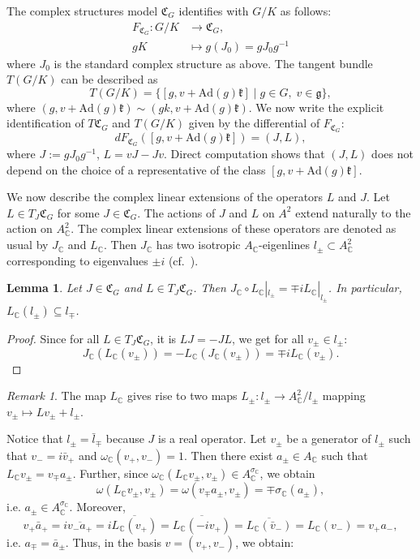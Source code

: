 \documentclass[oneside,11pt]{amsart}
\newtheorem{lem}[thm]{Lemma}
\theoremstyle{definition}
\theoremstyle{remark}
\newtheorem{rem}[thm]{Remark}
\numberwithin{thm}{section}
\numberwithin{equation}{section}
\begin{document}
The complex structures model $\mathfrak{C}_G$ identifies with $G/K$ as follows:
\begin{align*}
F_{\mathfrak{C}_G} \colon G/K&\to\mathfrak{C}_G,\\
gK& \mapsto g(J_0)=gJ_0g^{-1}
\end{align*}
where $J_0$ is the standard complex structure as above. The tangent bundle $T(G/K)$ can be described as 
$$T(G/K)=\{[g,v+\mathrm{Ad}(g)\mathfrak k]\mid g\in G,\;v\in\mathfrak g\},$$
where $(g,v+\mathrm{Ad}(g)\mathfrak k)\sim (gk,v+\mathrm{Ad}(g)\mathfrak k)$. We now write the explicit identification of $T\mathfrak{C}_G$ and $T(G/K)$ given by the differential of $F_{\mathfrak{C}_G}$: 
$$dF_{\mathfrak{C}_G}([g,v+\mathrm{Ad}(g)\mathfrak k])=(J,L),$$ 
where $J:=gJ_0g^{-1}$, $L=vJ-Jv$. Direct computation shows that $(J,L)$ does not depend on the choice of a representative of the class $[g,v+\mathrm{Ad}(g)\mathfrak k]$. 


We now describe the complex linear extensions of the operators $L$ and $J$. Let $L\in T_J\mathfrak{C}_G$ for some $J\in\mathfrak{C}_G$. The actions of $J$ and $L$ on $A^2$ extend naturally to the action on $A_\mathbb C^2$. The complex linear extensions of these operators are denoted as usual by $J_{\mathbb C}$ and $L_\mathbb C$. Then $J_\mathbb C$ has two isotropic $A_\mathbb C$-eigenlines $l_\pm\subset A^2_{\mathbb{C}}$ corresponding to eigenvalues $\pm i$ (cf.~\cite[Proposition~5.20]{ABRRW}).

\begin{lem}\label{lem:complexified_complex_structure}
    Let $J\in\mathfrak{C}_G$ and $L\in T_J\mathfrak{C}_G$. Then $J_\mathbb C\circ L_\mathbb C|_{l_\pm}=\mp iL_\mathbb C|_{l_\pm}$. In particular, $L_\mathbb C(l_\pm)\subseteq l_\mp$. 
\end{lem}

\begin{proof}
    Since for all $L\in T_J\mathfrak{C}_G$, it is $LJ=-JL$, we get for all $v_\pm\in l_\pm$:
    $$J_\mathbb C(L_\mathbb C(v_\pm))=- L_\mathbb C(J_\mathbb C(v_\pm))=\mp iL_\mathbb C(v_\pm).$$
\end{proof}

\begin{rem}
    The map $L_\mathbb C$ gives rise to two maps $L_\pm\colon l_\pm\to A_\mathbb C^2/l_\pm$ mapping $v_\pm\mapsto Lv_\pm + l_\pm$. 
\end{rem}

Notice that $l_\pm=\bar l_\mp$ because $J$ is a real operator. Let $v_\pm$ be a generator of $l_\pm$ such that $v_-=i\bar v_+$ and $\omega_\mathbb C(v_+,v_-)=1$. Then there exist $a_\pm\in A_\mathbb C$ such that $L_\mathbb C v_\pm=v_\mp a_\pm$. Further, since $\omega_{\mathbb C}(L_\mathbb C v_\pm,v_\pm)\in A^{\sigma_\mathbb C}_\mathbb C$, we obtain 
$$\omega(L_\mathbb C v_\pm,v_\pm)=\omega(v_\mp a_\pm,v_\pm)=\mp\sigma_{\mathbb C}(a_\pm),$$
i.e. $a_\pm\in A^{\sigma_\mathbb C}_\mathbb C$. Moreover, 
$$v_+\bar a_+=i\overline{v_- a_+}=i\overline{L_\mathbb C(v_+)}=\overline{L_\mathbb C(-iv_+)}=\overline{L_\mathbb C(\bar v_-)}=L_\mathbb C(v_-)=v_+ a_-,$$ 
i.e. $a_\mp=\bar a_\pm$. Thus, in the basis $v=(v_+,v_-)$, we obtain:
\end{document}
